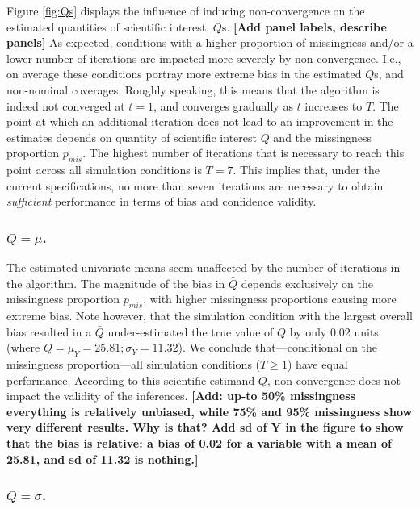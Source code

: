 \documentclass[Royal,times,sageh]{sagej}
\begin{document}
Figure \ref{fig:Qs} displays the influence of inducing non-convergence on the estimated quantities of scientific interest, \(Q\)s. \textbf{{[}Add panel labels, describe panels{]}} As expected, conditions with a higher proportion of missingness and/or a lower number of iterations are impacted more severely by non-convergence. I.e., on average these conditions portray more extreme bias in the estimated \(Q\)s, and non-nominal coverages. Roughly speaking, this means that the algorithm is indeed not converged at \(t=1\), and converges gradually as \(t\) increases to \(T\). The point at which an additional iteration does not lead to an improvement in the estimates depends on quantity of scientific interest \(Q\) and the missingness proportion \(p_{mis}\). The highest number of iterations that is necessary to reach this point across all simulation conditions is \(T=7\). This implies that, under the current specifications, no more than seven iterations are necessary to obtain \emph{sufficient} performance in terms of bias and confidence validity.

\hypertarget{qmu.}{%
\subsubsection{\texorpdfstring{\(Q=\mu\).}{Q=\textbackslash mu.}}\label{qmu.}}

The estimated univariate means seem unaffected by the number of iterations in the algorithm. The magnitude of the bias in \(\bar{Q}\) depends exclusively on the missingness proportion \(p_{mis}\), with higher missingness proportions causing more extreme bias. Note however, that the simulation condition with the largest overall bias resulted in a \(\bar{Q}\) under-estimated the true value of \(Q\) by only 0.02 units (where \(Q=\mu_Y=25.81; \sigma_Y = 11.32\)). We conclude that---conditional on the missingness proportion---all simulation conditions (\(T \geq 1\)) have equal performance. According to this scientific estimand \(Q\), non-convergence does not impact the validity of the inferences. \textbf{{[}Add: up-to 50\% missingness everything is relatively unbiased, while 75\% and 95\% missingness show very different results. Why is that? Add sd of Y in the figure to show that the bias is relative: a bias of 0.02 for a variable with a mean of 25.81, and sd of 11.32 is nothing.{]}}

\hypertarget{qsigma.}{%
\subsubsection{\texorpdfstring{\(Q=\sigma\).}{Q=\textbackslash sigma.}}\label{qsigma.}}
\end{document}
